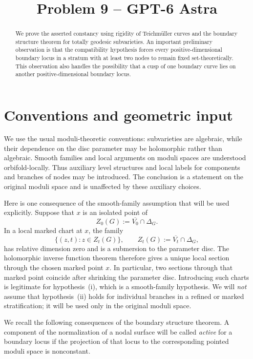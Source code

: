 \documentclass[11pt]{article}
\title{Problem 9 -- GPT-6 Astra}
\author{}
\date{}
\newcommand{\ol}[1]{\overline{#1}}
\theoremstyle{remark}
\begin{document}
\maketitle

\begin{abstract}
We prove the asserted constancy using rigidity of Teichm\"uller curves
and the boundary structure theorem for totally geodesic subvarieties.
An important preliminary observation is that the compatibility
hypothesis forces every positive-dimensional boundary locus in a
stratum with at least two nodes to remain fixed set-theoretically.
This observation also handles the possibility that a cusp of one
boundary curve lies on another positive-dimensional boundary locus.
\end{abstract}

\section{Conventions and geometric input}

We use the usual moduli-theoretic conventions: subvarieties are
algebraic, while their dependence on the disc parameter may be
holomorphic rather than algebraic. Smooth families and local
arguments on moduli spaces are understood orbifold-locally.
Thus auxiliary level structures and local labels for components and
branches of nodes may be introduced. The conclusion is a statement
on the original moduli space and is unaffected by these auxiliary
choices.

Here is one consequence of the smooth-family assumption that will
be used explicitly. Suppose that \(x\) is an isolated point of
\[
Z_0(G):=\ol{V_0}\cap\Delta_G.
\]
In a local marked chart at \(x\), the family
\[
\{(z,t):z\in Z_t(G)\},\qquad
Z_t(G):=\ol{V_t}\cap\Delta_G,
\]
has relative dimension zero and is a submersion to the parameter
disc. The holomorphic inverse function theorem therefore gives
a unique local section through the chosen marked point \(x\).
In particular, two sections through that marked point coincide
after shrinking the parameter disc. Introducing such charts is
legitimate for hypothesis~(i), which is a smooth-family hypothesis.
We will \emph{not} assume that hypothesis~(ii) holds for individual
branches in a refined or marked stratification; it will be used
only in the original moduli space.

We recall the following consequences of the boundary structure
theorem. A component of the normalization of a nodal surface will
be called \emph{active} for a boundary locus if the projection of
that locus to the corresponding pointed moduli space is
nonconstant.
\end{document}
